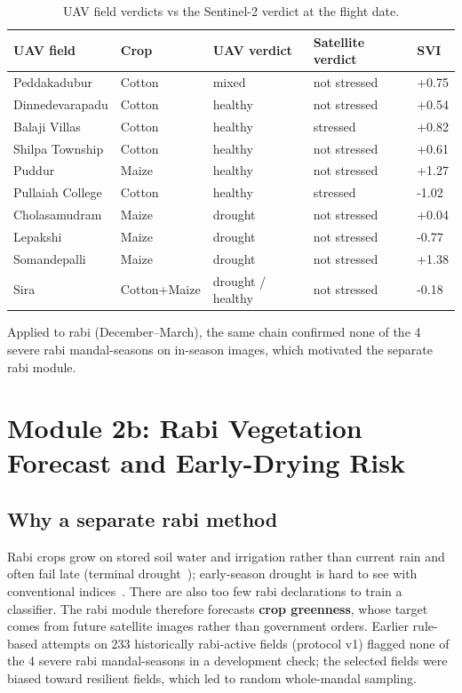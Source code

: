 \documentclass[11pt,a4paper,oneside]{article}
\begin{document}
\begin{table}[H]
\centering
\caption{UAV field verdicts vs the Sentinel-2 verdict at the flight date.}
\label{tab:s_uav}
\footnotesize
\begin{tabular}{@{}lllll@{}}
\toprule
\textbf{UAV field} & \textbf{Crop} & \textbf{UAV verdict} & \textbf{Satellite verdict} & \textbf{SVI} \\
\midrule
Peddakadubur & Cotton & mixed & not stressed & +0.75 \\
Dinnedevarapadu & Cotton & healthy & not stressed & +0.54 \\
Balaji Villas & Cotton & healthy & stressed & +0.82 \\
Shilpa Township & Cotton & healthy & not stressed & +0.61 \\
Puddur & Maize & healthy & not stressed & +1.27 \\
Pullaiah College & Cotton & healthy & stressed & -1.02 \\
Cholasamudram & Maize & drought & not stressed & +0.04 \\
Lepakshi & Maize & drought & not stressed & -0.77 \\
Somandepalli & Maize & drought & not stressed & +1.38 \\
Sira & Cotton+Maize & drought  / healthy & not stressed & -0.18 \\
\bottomrule
\end{tabular}
\end{table}


Applied to rabi (December--March), the same chain confirmed none of the 4 severe rabi mandal-seasons on in-season images, which motivated the separate rabi module.

\section{Module 2b: Rabi Vegetation Forecast and Early-Drying Risk}

\subsection{Why a separate rabi method}
Rabi crops grow on stored soil water and irrigation rather than current rain and often fail late (terminal drought~\cite{pang2017}); early-season drought is hard to see with conventional indices~\cite{nikam2020}. There are also too few rabi declarations to train a classifier. The rabi module therefore forecasts \textbf{crop greenness}, whose target comes from future satellite images rather than government orders. Earlier rule-based attempts on 233 historically rabi-active fields (protocol v1) flagged none of the 4 severe rabi mandal-seasons in a development check; the selected fields were biased toward resilient fields, which led to random whole-mandal sampling.
\end{document}
